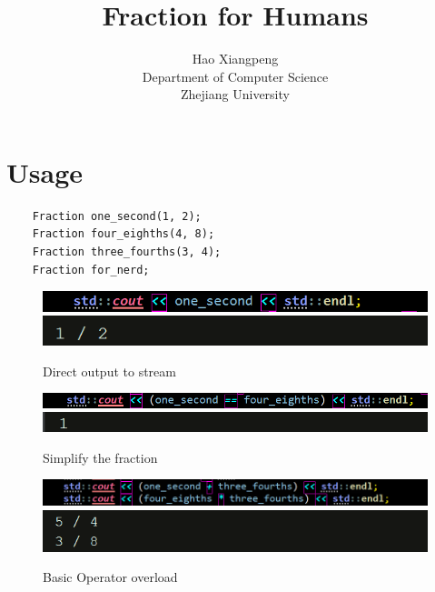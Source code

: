 \documentclass[a4paper]{article}
\begin{document}
\title{Fraction for Humans}
\author{Hao Xiangpeng \quad{}\\
	Department of Computer Science \\
	Zhejiang University \\
}

\maketitle
\newpage
\section{Usage}
\begin{lstlisting}
	Fraction one_second(1, 2);
	Fraction four_eighths(4, 8);
	Fraction three_fourths(3, 4);
	Fraction for_nerd;
\end{lstlisting}

\begin{figure}[H]
	\caption{Direct output to stream}
\includegraphics[width=\textwidth]{1.png}
\includegraphics[width=\textwidth]{1-1.png}
\end{figure}

\begin{figure}[h]
	\caption{ Simplify the fraction}
	\includegraphics[width=\textwidth]{2.png}
	\includegraphics[width=\textwidth]{2-1.png}
\end{figure}

\begin{figure}[h]
	\caption{Basic Operator overload}
	\includegraphics[width=\textwidth]{3.png}
	\includegraphics[width=\textwidth]{3-1.png}
\end{figure}
\end{document}
